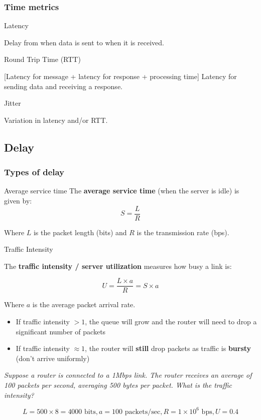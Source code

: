 \subsubsection{Time metrics}

\begin{knBox}
    {Latency}

    Delay from when data is sent to when it is received.
\end{knBox}

\begin{knBox}
    {Round Trip Time (RTT)}

    [Latency for message + latency for response + processing time] Latency for sending data and receiving a response.
\end{knBox}

\begin{knBox}
    {Jitter}

    Variation in latency and/or RTT.
\end{knBox}

\subsection{Delay}

\subsubsection{Types of delay}

\begin{definition}
    {Average service time}
    The \textbf{average service time} (when the server is idle) is given by:
    \[S = \frac{L}{R}\]

    Where $L$ is the packet length (bits) and $R$ is the transmission rate (bps).
\end{definition}


\begin{definition}
    {Traffic Intensity}

    The \textbf{traffic intensity / server utilization} measures how busy a link is:

    \[U = \frac{L \times a}{R} = S \times a\]

    Where $a$ is the average packet arrival rate.

    \begin{itemize}
        \item If traffic intensity $> 1$, the queue will grow and the router will need to drop a significant number of packets
        \item If traffic intensity $\approx 1$, the router will \textbf{still} drop packets as traffic is \textbf{bursty} (don't arrive uniformly)
    \end{itemize}

    \tcblower

    \textit{Suppose a router is connected to a 1Mbps link. The router receives an average of
        100 packets per second, averaging 500 bytes per packet. What is the traffic
        intensity?}

    \[L = 500 \times 8 = 4000 \text{ bits}, a = 100 \text{ packets/sec}, R = 1 \times 10^6 \text{ bps}, U = 0.4\]
\end{definition}

